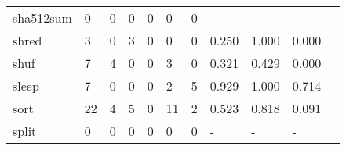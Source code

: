 \begin{longtable}{lp{1.2cm}p{1.2cm}p{1.2cm}p{1.2cm}p{1.2cm}p{1.2cm}p{1.2cm}p{1.2cm}p{1.2cm}p{1.2cm}}
sha512sum &                                     0 &                                                  0 &                                                0 &                                               0 &                                                0 &                                              0 &                                                  - &                                                  - &                                                  - \\
shred     &                                     3 &                                                  0 &                                                3 &                                               0 &                                                0 &                                              0 &                                              0.250 &                                              1.000 &                                              0.000 \\
shuf      &                                     7 &                                                  4 &                                                0 &                                               0 &                                                3 &                                              0 &                                              0.321 &                                              0.429 &                                              0.000 \\
sleep     &                                     7 &                                                  0 &                                                0 &                                               0 &                                                2 &                                              5 &                                              0.929 &                                              1.000 &                                              0.714 \\
sort      &                                    22 &                                                  4 &                                                5 &                                               0 &                                               11 &                                              2 &                                              0.523 &                                              0.818 &                                              0.091 \\
split     &                                     0 &                                                  0 &                                                0 &                                               0 &                                                0 &                                              0 &                                                  - &                                                  - &                                                  - \\

\end{longtable}
